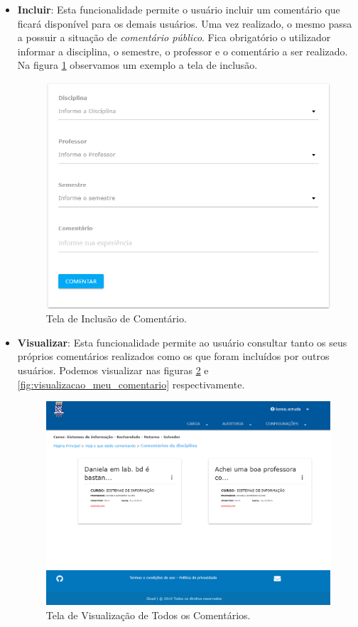 \documentclass[12pt, a4paper]{report}
\begin{document}
\begin{itemize}
\item \textbf{Incluir}: Esta funcionalidade permite o usuário incluir um comentário que ficará disponível para os demais usuários. Uma vez realizado, o mesmo passa a possuir a situação de \textit{comentário público}. Fica obrigatório o utilizador informar a disciplina, o semestre, o professor e o comentário a ser realizado. Na figura \ref{fig:incluir_comentario} observamos um exemplo a tela de inclusão.

\begin{figure}
\centering
\includegraphics[scale=0.59]{incluir_comentario2.png}
\caption{Tela de Inclusão de Comentário.}
\label{fig:incluir_comentario}
\end{figure}

\item \textbf{Visualizar}: Esta funcionalidade permite ao usuário consultar tanto os seus próprios comentários realizados como os que foram incluídos por outros usuários. Podemos visualizar nas figuras \ref{fig:comentarios} e \ref{fig:visualizacao_meu_comentario} respectivamente.

\begin{figure}
\centering
\includegraphics[scale=0.5]{comentarios2.png}
\caption{Tela de Visualização de Todos os Comentários.}
\label{fig:comentarios}
\end{figure}


\end{itemize}
\end{document}
